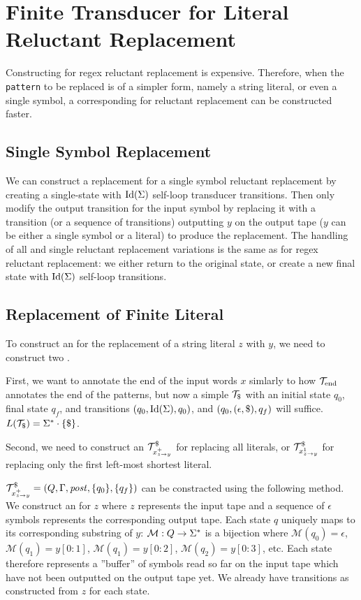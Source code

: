 \section{Finite Transducer for Literal Reluctant Replacement}

Constructing \nfts for regex reluctant replacement is expensive.
Therefore, when the \texttt{pattern} to be replaced is of a simpler form, namely a string literal, or even a single symbol, a corresponding \nft for reluctant replacement can be constructed faster.

\subsection{Single Symbol Replacement}

We can construct a replacement \dft for a single symbol reluctant replacement by creating a single-state \dft with $\text{Id}(\Sigma)$ self-loop transducer transitions.
Then only modify the output transition for the input symbol by replacing it with a transition (or a sequence of transitions) outputting $y$ on the output tape ($y$ can be either a single symbol or a literal) to produce the replacement.
The handling of all and single reluctant replacement variations is the same as for regex reluctant replacement: we either return to the original state, or create a new final state with $\text{Id}(\Sigma)$ self-loop transitions.

\subsection{Replacement of Finite Literal}

To construct an \nft for the replacement of a string literal $z$ with $y$, we need to construct two \nfts.

First, we want to annotate the end of the input words $x$ simlarly to how $\mathcal{T}_{\text{end}}$ annotates the end of the patterns, but now a simple \nft $\ft_\marker$ with an initial state $q_0$, final state $q_f$, and transitions $(q_0, \text{Id}(\Sigma), q_0)$, and $(q_0, (\epsilon, \$), q_f)$ will suffice.
$L(\mathcal{T}_\$) = \Sigma^* \cdot \{ \$ \}$.

Second, we need to construct an \nft $\mathcal{T}^\$_{x^{+}_{z \rightarrow y}}$ for replacing all literals, or $\mathcal{T}^\$_{x^{1}_{z \rightarrow y}}$ for replacing only the first left-most shortest literal.

$\mathcal{T}^\$_{x^{+}_{z \rightarrow y}} = (Q, \Gamma, \mathit{post}, \{ q_0 \}, \{ q_f \})$ can be constracted using the following method.
We construct an \nft for $z$ where $z$ represents the input tape and a sequence of $\epsilon$ symbols represents the corresponding output tape.
Each state $q$ uniquely maps to its corresponding substring of $y$: $\mathcal{M}: Q \rightarrow \Sigma^*$ is a bijection where $\mathcal{M}(q_0) = \epsilon$, $\mathcal{M}(q_1) = y[0:1]$, $\mathcal{M}(q_1) = y[0:2]$, $\mathcal{M}(q_2) = y[0:3]$, etc.
Each state therefore represents a ''buffer'' of symbols read so far on the input tape which have not been outputted on the output tape yet.
We already have transitions as constructed from $z$ for each state.

